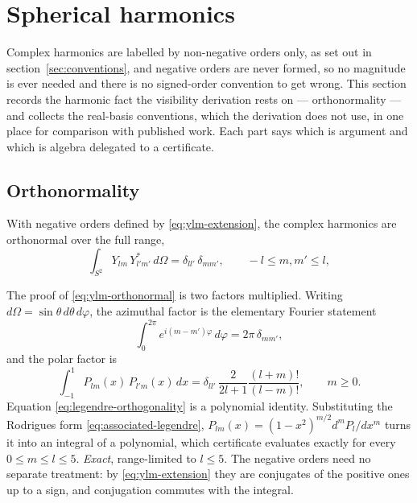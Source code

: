 
\section{Spherical harmonics}
\label{sec:harmonics}

Complex harmonics are labelled by non-negative orders only, as set out in
section~\ref{sec:conventions}, and negative orders are never formed, so no magnitude is ever
needed and there is no signed-order convention to get wrong.  This section records the
harmonic fact the visibility derivation rests on --- orthonormality --- and collects the
real-basis conventions, which the derivation does not use, in one place for comparison with
published work.  Each part says which is argument and which is algebra delegated to a
certificate.

\subsection{Orthonormality}
\label{sec:orthonormality}

With negative orders defined by \eqref{eq:ylm-extension}, the complex harmonics
are orthonormal over the full range,
\begin{equation}
  \int_{S^2} Y_{lm} \, Y_{l'm'}^* \, d\Omega
  = \delta_{ll'} \, \delta_{mm'} , \qquad -l \le m, m' \le l ,
  \label{eq:ylm-orthonormal}
\end{equation}

The proof of \eqref{eq:ylm-orthonormal} is two factors multiplied.  Writing
$d\Omega = \sin\theta\,d\theta\,d\varphi$, the azimuthal factor is the elementary
Fourier statement
\begin{equation}
  \int_0^{2\pi} e^{i(m-m')\varphi} \, d\varphi = 2\pi \, \delta_{mm'} ,
  \label{eq:fourier-orthogonality}
\end{equation}
and the polar factor is
\begin{equation}
  \int_{-1}^{1} P_{lm}(x) \, P_{l'm}(x) \, dx
  = \delta_{ll'} \, \frac{2}{2l+1} \frac{(l+m)!}{(l-m)!} , \qquad m \ge 0 .
  \label{eq:legendre-orthogonality}
\end{equation}
Equation \eqref{eq:legendre-orthogonality} is a polynomial identity.  Substituting
the Rodrigues form \eqref{eq:associated-legendre}, $P_{lm}(x) = (1-x^2)^{m/2}
d^m P_l/dx^m$ turns it into an integral of a polynomial, which
certificate  evaluates exactly for every $0 \le m \le l \le 5$.
\emph{Exact}, range-limited to $l \le 5$.  The negative orders need no separate
treatment: by \eqref{eq:ylm-extension} they are conjugates of the positive ones up
to a sign, and conjugation commutes with the integral.

